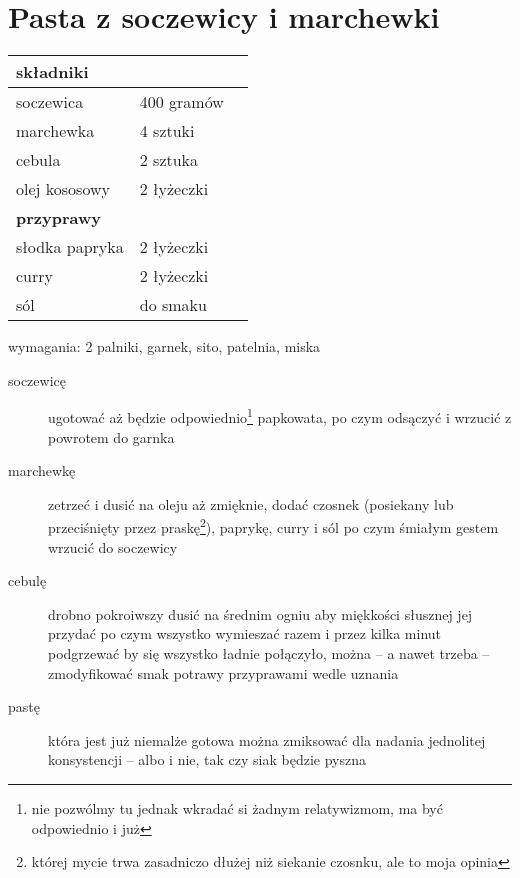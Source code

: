 	\section{Pasta z soczewicy i marchewki}
	\begin{table}[h]
	\begin{tabular}{l l l}
	\toprule
	\textbf{składniki} & \\
	\midrule
	soczewica & 400 gramów \\
	marchewka & 4 sztuki \\
	cebula 	  & 2 sztuka \\
	olej kososowy & 2 łyżeczki \\
	\midrule
	\textbf{przyprawy}&\\
	\midrule
	słodka papryka & 2 łyżeczki\\
	curry & 2 łyżeczki\\
	sól & do smaku\\
	\bottomrule
	\end{tabular}

	\end{table}
	\begin{exercise}[ok. 30 minut] wymagania: 2 palniki, garnek, sito, patelnia, miska
	\begin{description}
	\item[soczewicę] ugotować aż będzie odpowiednio\footnote{nie pozwólmy tu jednak wkradać si żadnym relatywizmom, ma być odpowiednio i już} papkowata, po czym odsączyć i wrzucić z powrotem do garnka
	\item[marchewkę] zetrzeć i dusić na oleju aż zmięknie, dodać czosnek (posiekany lub przeciśnięty przez praskę\footnote{której mycie trwa zasadniczo dłużej niż siekanie czosnku, ale to moja opinia}), paprykę, curry i sól po czym śmiałym gestem wrzucić do soczewicy
	\item[cebulę] drobno pokroiwszy dusić na średnim ogniu aby miękkości słusznej jej przydać po czym wszystko wymieszać razem i przez kilka minut podgrzewać by się wszystko ładnie połączyło, można -- a nawet trzeba -- zmodyfikować smak potrawy przyprawami wedle uznania
	\item[pastę] która jest już niemalże gotowa można zmiksować dla nadania jednolitej konsystencji -- albo i nie, tak czy siak będzie pyszna
	\end{description}
	\end{exercise}